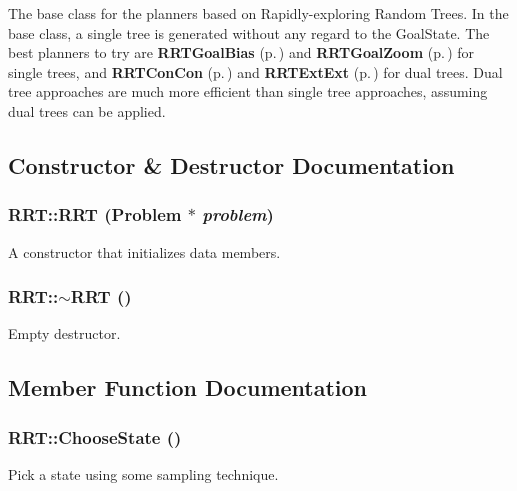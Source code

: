 The base class for the planners based on Rapidly-exploring  Random Trees. In the base class, a single tree is generated without any regard to the Goal\-State. The best planners to try are  {\bf RRTGoal\-Bias} {\rm (p.\,\pageref{classRRTGoalBias})} and {\bf RRTGoal\-Zoom} {\rm (p.\,\pageref{classRRTGoalZoom})} for single trees, and {\bf RRTCon\-Con} {\rm (p.\,\pageref{classRRTConCon})} and  {\bf RRTExt\-Ext} {\rm (p.\,\pageref{classRRTExtExt})} for dual trees. Dual tree approaches are much more efficient than single tree approaches, assuming dual trees can be applied. 



\subsection{Constructor \& Destructor Documentation}
\subsubsection{\setlength{\rightskip}{0pt plus 5cm}RRT::RRT ({\bf Problem} $\ast$ {\em problem})}\label{classRRT_a0}


A constructor that initializes data members.

\subsubsection{\setlength{\rightskip}{0pt plus 5cm}RRT::$\sim$RRT ()\hspace{0.3cm}{\tt  [inline, virtual]}}\label{classRRT_a1}


Empty destructor.



\subsection{Member Function Documentation}
\subsubsection{ RRT::Choose\-State ()\hspace{0.3cm}{\tt  [protected, virtual]}}\label{classRRT_b4}


Pick a state using some sampling technique.



